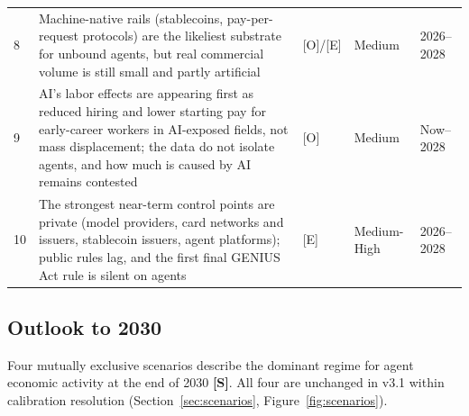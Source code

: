 \documentclass[11pt,letterpaper]{article}
\begin{document}
{\begin{longtable}{L{0.45cm}L{9.85cm}L{1.05cm}L{1.9cm}L{1.85cm}}
8 & Machine-native rails (stablecoins, pay-per-request protocols) are the likeliest substrate for unbound agents, but real commercial volume is still small and partly artificial & [O]/[E] & Medium & 2026--2028 \\
9 & AI's labor effects are appearing first as reduced hiring and lower starting pay for early-career workers in AI-exposed fields, not mass displacement; the data do not isolate agents, and how much is caused by AI remains contested & [O] & Medium & Now--2028 \\
10 & The strongest near-term control points are private (model providers, card networks and issuers, stablecoin issuers, agent platforms); public rules lag, and the first final GENIUS Act rule is silent on agents & [E] & Medium-High & 2026--2028 \\
\bottomrule
\end{longtable}
}

\subsection*{Outlook to 2030}

Four mutually exclusive scenarios describe the dominant regime for agent economic activity at the end of 2030 \textbf{[S]}. All four are unchanged in v3.1 within calibration resolution (Section~\ref{sec:scenarios}, Figure~\ref{fig:scenarios}).

\begin{center}
\end{center}
\end{document}

